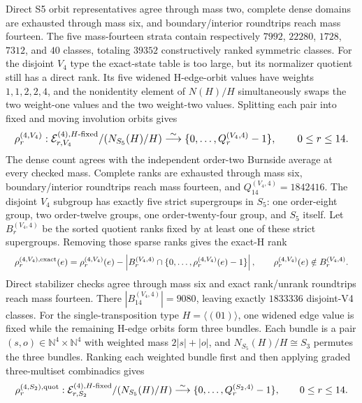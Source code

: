 \documentclass{article}
\newcommand{\fitmath}[1]{\resizebox{0.99\linewidth}{!}{$\displaystyle #1$}}
\begin{document}
Direct S5 orbit representatives agree through mass two, complete dense domains
are exhausted through mass six, and boundary/interior roundtrips reach mass
fourteen. The five mass-fourteen strata contain respectively $7992$, $22280$,
$1728$, $7312$, and $40$ classes, totaling $39352$ constructively ranked
symmetric classes.
For the disjoint $V_4$ type the exact-state table is too large, but its
normalizer quotient still has a direct rank. Its five widened H-edge-orbit
values have weights $1,1,2,2,4$, and the nonidentity element of $N(H)/H$
simultaneously swaps the two weight-one values and the two weight-two values.
Splitting each pair into fixed and moving involution orbits gives
\begin{equation}
  \fitmath{%
    \rho^{(4,V_4)}_r:
      \mathcal E_{r,V_4}^{(4),H\text{-fixed}}/(N_{S_5}(H)/H)
      \overset{\sim}{\longrightarrow}
      \{0,\ldots,Q_r^{(V_4,4)}-1\},
    \qquad 0\leq r\leq14.
  }
  \label{eq:optimization-crazy-sextuple-s6-s5-disjoint-v4-quotient-ranking}
\end{equation}
The dense count agrees with the independent order-two Burnside average at every
checked mass. Complete ranks are exhausted through mass six, boundary/interior
roundtrips reach mass fourteen, and $Q_{14}^{(V_4,4)}=1842416$.
The disjoint $V_4$ subgroup has exactly five strict supergroups in $S_5$: one
order-eight group, two order-twelve groups, one order-twenty-four group, and
$S_5$ itself. Let $B_r^{(V_4,4)}$ be the sorted quotient ranks fixed by at least
one of these strict supergroups. Removing those sparse ranks gives the exact-H
rank
\begin{equation}
  \fitmath{%
    \rho^{(4,V_4),\mathrm{exact}}_r(e)=
      \rho^{(4,V_4)}_r(e)-
      \left|B_r^{(V_4,4)}\cap
      \{0,\ldots,\rho^{(4,V_4)}_r(e)-1\}\right|,
    \qquad
    \rho^{(4,V_4)}_r(e)\notin B_r^{(V_4,4)}.
  }
  \label{eq:optimization-crazy-sextuple-s6-s5-disjoint-v4-exact-ranking}
\end{equation}
Direct stabilizer checks agree through mass six and exact rank/unrank roundtrips
reach mass fourteen. There $|B_{14}^{(V_4,4)}|=9080$, leaving exactly $1833336$
disjoint-V4 classes.
For the single-transposition type $H=\langle(01)\rangle$, one widened edge value
is fixed while the remaining H-edge orbits form three bundles. Each bundle is a
pair $(s,o)\in\mathbb N^4\times\mathbb N^4$ with weighted mass
$2|s|+|o|$, and $N_{S_5}(H)/H\cong S_3$ permutes the three bundles. Ranking each
weighted bundle first and then applying graded three-multiset combinadics gives
\begin{equation}
  \fitmath{%
    \rho^{(4,S_2),\mathrm{quot}}_r:
      \mathcal E_{r,S_2}^{(4),H\text{-fixed}}/(N_{S_5}(H)/H)
      \overset{\sim}{\longrightarrow}
      \{0,\ldots,Q_r^{(S_2,4)}-1\},
    \qquad 0\leq r\leq14.
  }
  \label{eq:optimization-crazy-sextuple-s6-s5-transposition-quotient-ranking}
\end{equation}
\end{document}
